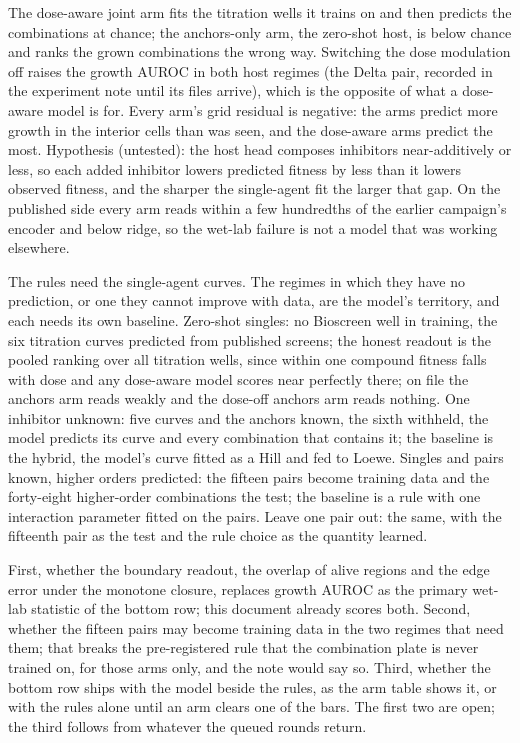 The dose-aware joint arm fits the titration wells it trains on
and then predicts the combinations at chance; the anchors-only arm, the zero-shot host,
is below chance and ranks the grown combinations the wrong way. Switching the dose
modulation off raises the growth AUROC in both host regimes (the Delta pair, recorded in
the experiment note until its files arrive), which is the opposite of what a dose-aware
model is for. Every arm's grid residual is negative: the arms predict more growth in the
interior cells than was seen, and the dose-aware arms predict the most. Hypothesis
(untested): the host head composes inhibitors near-additively or less, so each added
inhibitor lowers predicted fitness by less than it lowers observed fitness, and the
sharper the single-agent fit the larger that gap. On the published side every arm reads
within a few hundredths of the earlier campaign's encoder and below ridge, so the wet-lab
failure is not a model that was working elsewhere.

 The rules need the single-agent
curves. The regimes in which they have no prediction, or one they cannot improve with
data, are the model's territory, and each needs its own baseline. Zero-shot singles: no
Bioscreen well in training, the six titration curves predicted from published screens; the
honest readout is the pooled ranking over all titration wells, since within one compound
fitness falls with dose and any dose-aware model scores near perfectly there; on file the
anchors arm reads weakly and the dose-off anchors arm reads nothing. One inhibitor
unknown: five curves and the anchors known, the sixth withheld, the model predicts its
curve and every combination that contains it; the baseline is the hybrid, the model's
curve fitted as a Hill and fed to Loewe. Singles and pairs known, higher orders predicted:
the fifteen pairs become training data and the forty-eight higher-order combinations the
test; the baseline is a rule with one interaction parameter fitted on the pairs. Leave one
pair out: the same, with the fifteenth pair as the test and the rule choice as the
quantity learned.

 First, whether the boundary readout, the overlap
of alive regions and the edge error under the monotone closure, replaces growth AUROC as
the primary wet-lab statistic of the bottom row; this document already scores both.
Second, whether the fifteen pairs may become training data in the two regimes that need
them; that breaks the pre-registered rule that the combination plate is never trained on,
for those arms only, and the note would say so. Third, whether the bottom row ships with
the model beside the rules, as the arm table shows it, or with the rules alone until an
arm clears one of the bars. The first two are open; the third follows from whatever the
queued rounds return.

